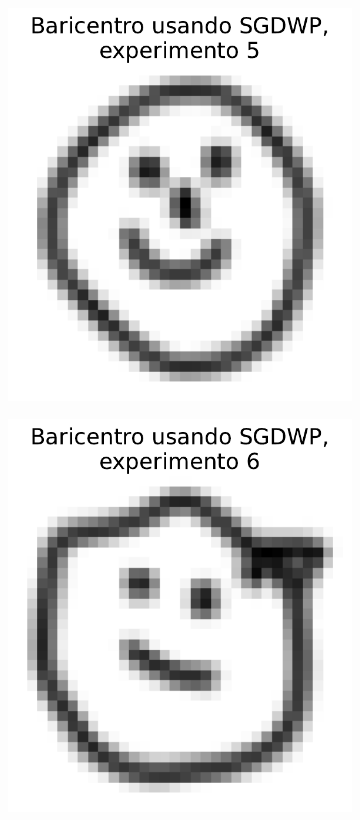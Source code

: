 \begin{figure}[H]
\begin{subfigure}[b]{0.17\textwidth}
        \includegraphics[width=\textwidth]{img/sgdwp/bar-SGDWP-exp-05.pdf}
        \label{fig:bar-SGDWP-exp-05}
    \end{subfigure}
    \newline
    \begin{subfigure}[b]{0.17\textwidth}
        \centering
        \includegraphics[width=\textwidth]{img/sgdwp/bar-SGDWP-exp-06.pdf}

\end{subfigure}
\end{figure}
